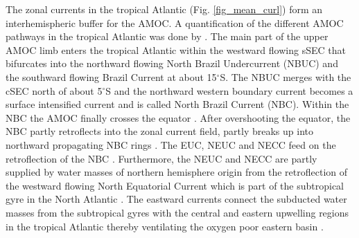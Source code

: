 \documentclass[os, manuscript]{copernicus}
\begin{document}
	The zonal currents in the tropical Atlantic (Fig. \ref{fig_mean_curl}) form an interhemispheric buffer for the AMOC. A quantification of the different AMOC pathways in the tropical Atlantic was done by \cite{Tuchen2022}. The main part of the upper AMOC limb enters the tropical Atlantic within the westward flowing sSEC that bifurcates into the northward flowing North Brazil Undercurrent (NBUC) and the southward flowing Brazil Current at about 15$^{\circ}$S. The NBUC merges with the cSEC north of about 5$^{\circ}$S and the northward western boundary current becomes a surface intensified current and is called North Brazil Current (NBC). Within the NBC the AMOC finally crosses the equator \citep[e.g.][]{Schott2004,Hazeleger2006,Ruhs2015}. After overshooting the equator, the NBC partly retroflects into the zonal current field, partly breaks up into northward propagating NBC rings \citep{Johns2003}. The EUC, NEUC and NECC feed on the retroflection of the NBC \citep{Bourles1999,Huettl2008,Rosell-Fieschi2015,Stramma2005}. Furthermore, the NEUC and NECC are partly supplied by water masses of northern hemisphere origin from the retroflection of the westward flowing North Equatorial Current which is part of the subtropical gyre in the North Atlantic \cite[e.g.][]{Schott1998,Bourles1999,Urbano2008}. The eastward currents connect the subducted water masses from the subtropical gyres with the central and eastern upwelling regions in the tropical Atlantic thereby ventilating the oxygen poor eastern basin \cite[][]{Stramma2008,Urbano2008,Hahn2014,Brandt2015,Hahn2017,Burmeister2019,Burmeister2020}.
	
	
	
\end{document}
